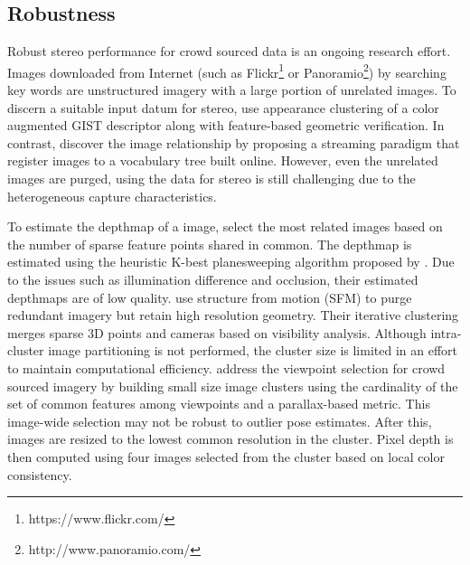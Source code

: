 %

\subsection{Robustness}
Robust stereo performance for crowd sourced data is an ongoing research effort.
Images downloaded from Internet (such as Flickr\footnote{https://www.flickr.com/} or Panoramio\footnote{http://www.panoramio.com/}) by searching key words are unstructured imagery with a large portion of unrelated images. To discern a suitable input datum for stereo, \citet{Frahm2010}  use appearance clustering of a color augmented GIST descriptor \cite{oliva2001modeling} along with feature-based geometric verification. In contrast, \cite{Heinly} discover the image relationship by proposing a streaming paradigm that register images to a vocabulary tree built online. However, even the unrelated images are purged, using the data for stereo is still challenging due to the heterogeneous capture characteristics.

To estimate the depthmap of a image, \citet{Frahm2010} select the most related images based on the number of sparse feature points shared in common. The depthmap is estimated using the heuristic K-best planesweeping algorithm proposed by \cite{handle_occlusion2001}. Due to the issues such as illumination difference and occlusion, their estimated depthmaps are of low quality. 
\citet{InternetScaleMVS_CVPR2010} use structure from motion (SFM) to purge redundant imagery but retain high resolution geometry. Their iterative clustering merges sparse 3D points and cameras based on visibility analysis. Although intra-cluster image partitioning is not performed, the cluster size is limited in an effort to maintain computational efficiency. \citet{Goesele07} address the viewpoint selection for crowd sourced imagery by building small size image clusters using the cardinality of the set of common features among viewpoints and a parallax-based metric. This image-wide selection may not be robust to outlier pose estimates. After this, images are resized to the lowest common resolution in the cluster. Pixel depth is then computed using four images selected from the cluster based on local color consistency.

